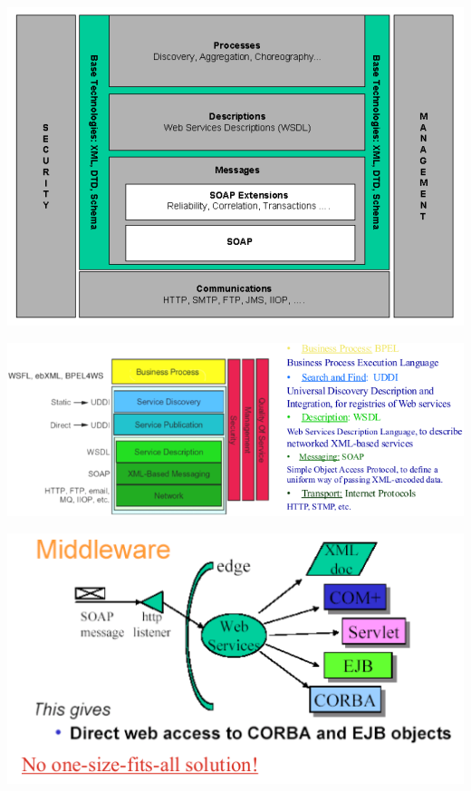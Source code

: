 \documentclass[a4paper,12pt, oneside]{book}
\begin{document}
\begin{center}
  \includegraphics[scale=0.6]{img/ws1.png}
\end{center}
\begin{center}
  \includegraphics[scale=0.7]{img/ws2.png}
\end{center}
\begin{center}
  \includegraphics[scale=0.5]{img/ws3.png}
\end{center}
\newpage
\end{document}
